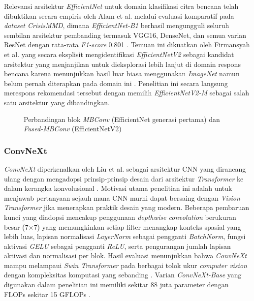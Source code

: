 Relevansi arsitektur \textit{EfficientNet} untuk domain klasifikasi
citra bencana telah dibuktikan secara empiris oleh Alam et al. melalui
evaluasi komparatif pada \textit{dataset CrisisMMD}, dimana
\textit{EfficientNet-B1} berhasil mengungguli seluruh sembilan arsitektur
pembanding termasuk VGG16, DenseNet, dan semua varian ResNet dengan
rata-rata \textit{F1-score} 0.801 \cite{ofli2020benchmarks}. Temuan
ini dikuatkan oleh Firmansyah et al. yang secara eksplisit
mengidentifikasi \textit{EfficientNetV2} sebagai kandidat arsitektur
yang menjanjikan untuk dieksplorasi lebih lanjut di domain respons
bencana karena menunjukkan hasil luar biasa menggunakan \textit{ImageNet}
namun belum pernah diterapkan pada domain ini \cite{firmansyah2022ensemble}.
Penelitian ini secara langsung merespons rekomendasi tersebut dengan
memilih \textit{EfficientNetV2-M} sebagai salah satu arsitektur
yang dibandingkan. \par

\begin{figure}[h]
    \centering
    \fbox{\rule{0pt}{3.5cm}\rule{0.75\textwidth}{0pt}}
    \caption{Perbandingan blok \textit{MBConv} (EfficientNet generasi
    pertama) dan \textit{Fused-MBConv} (EfficientNetV2)
    \cite{tan2021efficientnetv2}}
    \label{fig:efficientnetv2_block}
\end{figure}

\subsubsection{ConvNeXt}
\textit{ConvNeXt} diperkenalkan oleh Liu et al. sebagai arsitektur CNN
yang dirancang ulang dengan mengadopsi prinsip-prinsip desain dari
arsitektur \textit{Transformer} ke dalam kerangka konvolusional
\cite{liu2022convnext}. Motivasi utama penelitian ini adalah untuk
menjawab pertanyaan sejauh mana CNN murni dapat bersaing dengan
\textit{Vision Transformer} jika menerapkan praktik desain yang modern.
Beberapa pembaruan kunci yang diadopsi mencakup penggunaan
\textit{depthwise convolution} berukuran besar (7$\times$7) yang
memungkinkan setiap filter menangkap konteks spasial yang lebih luas,
lapisan normalisasi \textit{LayerNorm} sebagai pengganti
\textit{BatchNorm}, fungsi aktivasi \textit{GELU} sebagai pengganti
\textit{ReLU}, serta pengurangan jumlah lapisan aktivasi dan normalisasi
per blok. Hasil evaluasi menunjukkan bahwa \textit{ConvNeXt} mampu
melampaui \textit{Swin Transformer} pada berbagai tolok ukur
\textit{computer vision} dengan kompleksitas komputasi yang sebanding
\cite{liu2022convnext}. Varian \textit{ConvNeXt-Base} yang digunakan
dalam penelitian ini memiliki sekitar 88 juta parameter dengan FLOPs
sekitar 15 GFLOPs \cite{liu2022convnext}. \par

